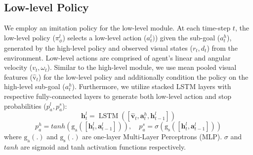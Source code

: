 \documentclass[letter, 10pt, conference]{ieeeconf}
\begin{document}
\subsection{Low-level Policy}
We employ an imitation policy for the low-level module. 
At each time-step $t$, the low-level policy ($\pi^{l}_{\phi}$) selects a low-level action ($a^{l}_{t})$) given the sub-goal ($a^{h}_{t}$), generated by the high-level policy and observed visual states ($r_{t}, d_{t}$) from the environment. Low-level actions are comprised of agent's linear and angular velocity ($v_{t}, \omega_{t}$). Similar to the high-level module, we use mean pooled visual features ($\hat{\mathrm{v}}_{t}$) for the low-level policy and additionally condition the policy on the high-level sub-goal ($a^{h}_{t}$). Furthermore, we utilize stacked LSTM layers with respective fully-connected layers to generate both low-level action and stop probabilities ($p^{l}_{a},p^{s}_{a}$):
\begin{equation}
\boldsymbol{h}^{l}_{t}=\operatorname{LSTM}\left(\left[\hat{\boldsymbol{v}}_{t}, \boldsymbol{a}^{h}_{t}, \boldsymbol{h}^{l}_{t-1}\right]\right)
\end{equation}
\begin{equation}
p^{h}_{a} = tanh(\mathrm{g_{a}} ([ \boldsymbol{h}^{l}_{t}, \boldsymbol{a}^{l}_{t-1} ])), \quad
p^{s}_{a} = \sigma(\mathrm{g_{s}} ([ \boldsymbol{h}^{l}_{t}, \boldsymbol{a}^{l}_{t-1}]))
\end{equation} 
where $\mathrm{g_{a}(.)}$ and $\mathrm{g_{s}(.)}$ are one-layer Multi-Layer Perceptrons (MLP). $\sigma$ and $tanh$ are sigmoid and tanh activation functions respectively.
\end{document}
